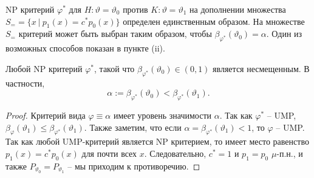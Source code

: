 \begin{rmrk}
	NP критерий $\varphi^*$ для $H:\vartheta = \vartheta_0$ против $K:\vartheta = \vartheta_1$ на дополнении множества $S_= =\{x\ |\ p_1(x) = c^*p_0(x) \}$ определен единственным образом. На множестве $S_=$ критерий может быть выбран таким образом, чтобы $\beta_{\varphi^*}(\vartheta_0) = \alpha$. Один из возможных способов показан в пункте (ii). 
\end{rmrk}

\begin{crlr} \label{crlr6.16}
	Любой NP критерий $\varphi^*$, такой что $\beta_{\varphi^*}(\vartheta_0) \in (0, 1)$ является несмещенным. В частности,
	\[ \alpha:=\beta_{\varphi^*}(\vartheta_0) < \beta_{\varphi^*}(\vartheta_1). \]
\end{crlr}
\begin{proof}
	Критерий вида $\varphi \equiv \alpha$ имеет уровень значимости $\alpha$. Так как $\varphi^*$ -- UMP, $\beta_\varphi(\vartheta_1) \leq \beta_{\varphi^*}(\vartheta_1)$. Также заметим, что если $\alpha = \beta_{\varphi^*}(\vartheta_1) < 1$, то $\varphi$ -- UMP. Так как любой UMP-критерий является NP критерием, то имеет место равенство $p_1(x) = c^*p_0(x)$ для почти всех $x$. Следовательно, $c^*=1$ и $p_1 =p_0$ $\mu$-п.н., и также $P_{\vartheta_0} = P_{\vartheta_1}$ -- мы приходим к противоречию.
\end{proof}

